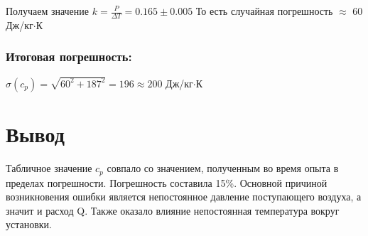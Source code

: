 \documentclass[a4paper,17pt]{article}
\begin{document}
            Получаем значение $k = \frac{P}{\Delta T} = 0.165 \pm 0.005$
            То есть случайная погрешность $\approx$ 60 Дж/кг$\cdot$К
        \subsubsection{Итоговая погрешность:}
            \begin{center}
                $\sigma(c_p) = \sqrt{60^2 + 187^2} = 196 \approx 200$ Дж/кг$\cdot$К
            \end{center}
    
\section{Вывод}
    Табличное значение $c_p$ совпало со значением, полученным во время опыта в пределах погрешности. Погрешность составила 15\%. Основной причиной возникновения ошибки является непостоянное давление поступающего воздуха, а значит и расход Q. Также оказало влияние непостоянная температура вокруг установки.
\end{document}
